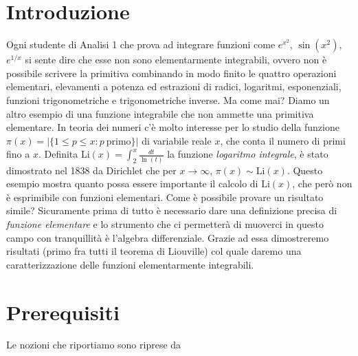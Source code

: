 \documentclass[10pt,oneside]{article}
\theoremstyle{definition}
\theoremstyle{plain}
\theoremstyle{definition}
\theoremstyle{plain}
\theoremstyle{plain}
\begin{document}
 

\begin{frontespizio}
\Margini{1cm}{3cm}{1cm}{1cm}
\end{frontespizio}





\tableofcontents
\section{Introduzione}

Ogni studente di Analisi 1 che prova ad integrare funzioni come $e^{x^2}$, $\sin(x^2)$, $e^{1/x}$ si sente dire che esse non sono elementarmente integrabili, ovvero non è possibile scrivere la primitiva combinando in modo finito le quattro operazioni elementari, elevamenti a potenza ed estrazioni di radici, logaritmi, esponenziali, funzioni trigonometriche e trigonometriche inverse. Ma come mai? Diamo un altro esempio di una funzione integrabile che non ammette una primitiva elementare. In teoria dei numeri c'è molto interesse per lo studio della funzione $\pi(x)=|\{1 \le p \le x : p \ \text{primo}\}|$ di variabile reale $x$, che conta il numero di primi fino a $x$. Definita $\mathrm{Li}(x)=\int_{2}^x \frac{dt}{\ln(t)}$ la funzione \textit{logaritmo integrale}, è stato dimostrato nel 1838 da Dirichlet che per $x \to \infty$, $\pi(x) \sim \mathrm{Li}(x)$. Questo esempio mostra quanto possa essere importante il calcolo di $\mathrm{Li}(x)$, che però non è esprimibile con funzioni elementari. Come è possibile provare un risultato simile? Sicuramente prima di tutto è necessario dare una definizione precisa di \emph{funzione elementare} e lo strumento che ci permetterà di muoverci in questo campo con tranquillità è l'algebra differenziale. Grazie ad essa dimostreremo risultati (primo fra tutti il teorema di Liouville) col quale daremo una caratterizzazione delle funzioni elementarmente integrabili.
\section{Prerequisiti}
Le nozioni che riportiamo sono riprese da \cite{Cas}
\end{document}

